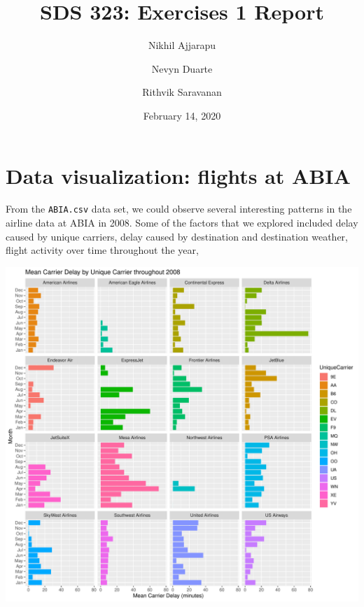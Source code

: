 \documentclass[]{article}
\title{SDS 323: Exercises 1 Report}
\author{Nikhil Ajjarapu \and Nevyn Duarte \and Rithvik Saravanan}
\date{February 14, 2020}
\begin{document}
\maketitle

\hypertarget{data-visualization-flights-at-abia}{%
\section{Data visualization: flights at
ABIA}\label{data-visualization-flights-at-abia}}

From the \texttt{ABIA.csv} data set, we could observe several
interesting patterns in the airline data at ABIA in 2008. Some of the
factors that we explored included delay caused by unique carriers, delay
caused by destination and destination weather, flight activity over time
throughout the year,

\includegraphics{Report_files/figure-latex/abia2-1.pdf}
\end{document}

